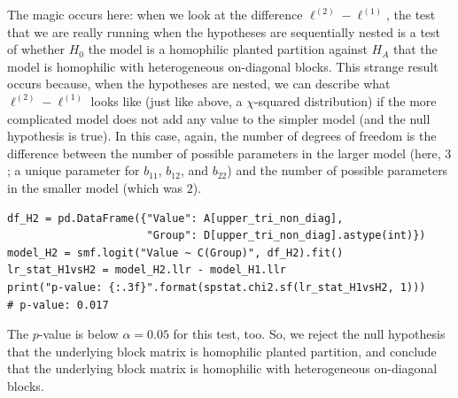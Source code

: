 The magic occurs here: when we look at the difference $\ell^{(2)} - \ell^{(1)}$, the test that we are really running when the hypotheses are sequentially nested is a test of whether $H_0$ the model is a homophilic planted partition against $H_A$ that the model is homophilic with heterogeneous on-diagonal blocks. This strange result occurs because, when the hypotheses are nested, we can describe what $\ell^{(2)} - \ell^{(1)}$ looks like (just like above, a $\chi$-squared distribution) if the more complicated model does not add any value to the simpler model (and the null hypothesis is true). In this case, again, the number of degrees of freedom is the difference between the number of possible parameters in the larger model (here, $3$; a unique parameter for $b_{11}$, $b_{12}$, and $b_{22}$) and the number of possible parameters in the smaller model (which was $2$). 

\begin{lstlisting}[style=python]
df_H2 = pd.DataFrame({"Value": A[upper_tri_non_diag],
                      "Group": D[upper_tri_non_diag].astype(int)})
model_H2 = smf.logit("Value ~ C(Group)", df_H2).fit()
lr_stat_H1vsH2 = model_H2.llr - model_H1.llr
print("p-value: {:.3f}".format(spstat.chi2.sf(lr_stat_H1vsH2, 1)))
# p-value: 0.017
\end{lstlisting}

The $p$-value is below $\alpha=0.05$ for this test, too. So, we reject the null hypothesis that the underlying block matrix is homophilic planted partition, and conclude that the underlying block matrix is homophilic with heterogeneous on-diagonal blocks.

\newpage